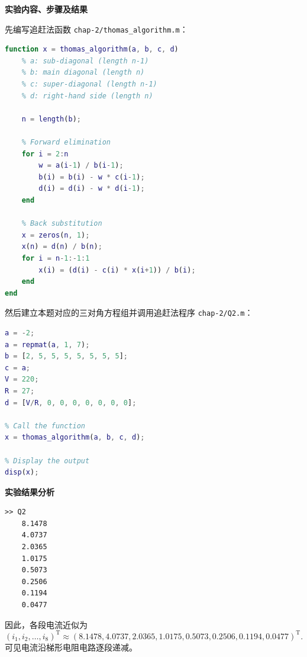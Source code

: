 \documentclass[11pt, a4paper]{ctexart}
\begin{document}
\begin{solution}
    \textbf{实验内容、步骤及结果}

    先编写追赶法函数 \texttt{chap-2/thomas\_algorithm.m}：

\begin{lstlisting}[language=Matlab]
function x = thomas_algorithm(a, b, c, d)
    % a: sub-diagonal (length n-1)
    % b: main diagonal (length n)
    % c: super-diagonal (length n-1)
    % d: right-hand side (length n)
    
    n = length(b);
    
    % Forward elimination
    for i = 2:n
        w = a(i-1) / b(i-1);
        b(i) = b(i) - w * c(i-1);
        d(i) = d(i) - w * d(i-1);
    end
    
    % Back substitution
    x = zeros(n, 1);
    x(n) = d(n) / b(n);
    for i = n-1:-1:1
        x(i) = (d(i) - c(i) * x(i+1)) / b(i);
    end
end
\end{lstlisting}

    然后建立本题对应的三对角方程组并调用追赶法程序 \texttt{chap-2/Q2.m}：

\begin{lstlisting}[language=Matlab]
% Define input parameters
a = -2;
a = repmat(a, 1, 7);
b = [2, 5, 5, 5, 5, 5, 5, 5];
c = a;
V = 220;
R = 27;
d = [V/R, 0, 0, 0, 0, 0, 0, 0];

% Call the function
x = thomas_algorithm(a, b, c, d);

% Display the output
disp(x);
\end{lstlisting}

    \textbf{实验结果分析}

\begin{lstlisting}
>> Q2
    8.1478
    4.0737
    2.0365
    1.0175
    0.5073
    0.2506
    0.1194
    0.0477
\end{lstlisting}

    因此，各段电流近似为
    \[
        (i_1, i_2, \dots, i_8)^{\mathrm{T}}
        \approx
        (8.1478, 4.0737, 2.0365, 1.0175, 0.5073, 0.2506, 0.1194, 0.0477)^{\mathrm{T}}.
    \]
    可见电流沿梯形电阻电路逐段递减。
\end{solution}
\end{document}
